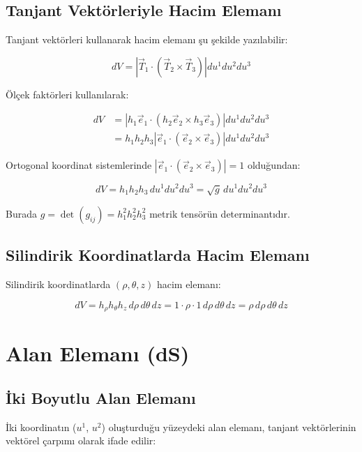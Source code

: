 \documentclass[11pt,letterpaper,twocolumn]{fenbil}
\begin{document}
\subsection{Tanjant Vektörleriyle Hacim Elemanı}

Tanjant vektörleri kullanarak hacim elemanı şu şekilde yazılabilir:

\begin{equation}
dV = |\vec{T}_1 \cdot (\vec{T}_2 \times \vec{T}_3)| du^1 du^2 du^3
\end{equation}

Ölçek faktörleri kullanılarak:

\begin{align}
dV &= |h_1 \vec{e}_1 \cdot (h_2 \vec{e}_2 \times h_3 \vec{e}_3)| du^1 du^2 du^3\\
&= h_1 h_2 h_3 |\vec{e}_1 \cdot (\vec{e}_2 \times \vec{e}_3)| du^1 du^2 du^3
\end{align}

Ortogonal koordinat sistemlerinde $|\vec{e}_1 \cdot (\vec{e}_2 \times \vec{e}_3)| = 1$ olduğundan:

\begin{equation}
dV = h_1 h_2 h_3 \, du^1 du^2 du^3 = \sqrt{g} \, du^1 du^2 du^3
\end{equation}

Burada $g = \det(g_{ij}) = h_1^2 h_2^2 h_3^2$ metrik tensörün determinantıdır.

\subsection{Silindirik Koordinatlarda Hacim Elemanı}

Silindirik koordinatlarda $(\rho, \theta, z)$ hacim elemanı:

\begin{equation}
dV = h_\rho h_\theta h_z \, d\rho \, d\theta \, dz = 1 \cdot \rho \cdot 1 \, d\rho \, d\theta \, dz = \rho \, d\rho \, d\theta \, dz
\end{equation}

\section{Alan Elemanı (dS)}

\subsection{İki Boyutlu Alan Elemanı}

İki koordinatın ($u^1$, $u^2$) oluşturduğu yüzeydeki alan elemanı, tanjant vektörlerinin vektörel çarpımı olarak ifade edilir:
\end{document}
